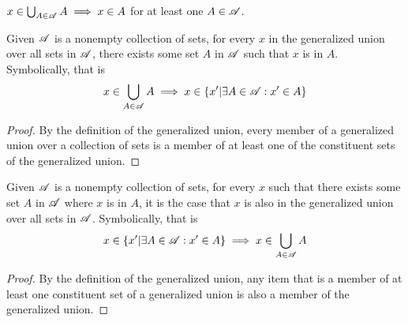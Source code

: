 \documentclass[main.tex]{subfiles}
\begin{document}
\subproblem{}\label{5a}

\(x \in \bigcup_{A \in \mathscr{A}} {A} \implies x \in A\) for at
least one \(A \in \mathscr{A}\).

\begin{thm}
	Given \(\mathscr{A}\) is a nonempty collection of sets, for every \(x\)
	in the generalized union over all sets in \(\mathscr{A}\), there exists
	some set \(A\) in \(\mathscr{A}\) such that \(x\) is in \(A\).
	Symbolically, that is
	\[x \in \bigcup\limits_{A \in \mathscr{A}} {A} \implies x \in \{x'|\exists A \in \mathscr{A} : x' \in A\}\]
\end{thm}
\begin{proof}
	By the definition of the generalized union, every member of a
	generalized union over a collection of sets is a member of at least one
	of the constituent sets of the generalized union.
\end{proof}

\begin{thm}
	Given \(\mathscr{A}\) is a nonempty collection of sets, for every \(x\)
	such that there exists some set \(A\) in \(\mathscr{A}\) where \(x\) is
	in \(A\), it is the case that \(x\) is also in the generalized union
	over all sets in \(\mathscr{A}\). Symbolically, that is
	\[x \in \{x'|\exists A \in \mathscr{A} : x' \in A\} \implies x \in \bigcup\limits_{A \in \mathscr{A}} {A}\]
\end{thm}
\begin{proof}
	By the definition of the generalized union, any item that is a member of
	at least one constituent set of a generalized union is also a member of
	the generalized union.
\end{proof}
\end{document}

